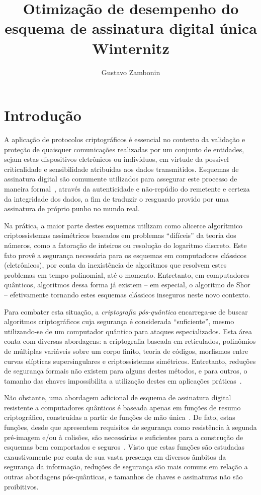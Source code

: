 \documentclass[12pt]{report}
\title{
  Otimização de desempenho
  do esquema de assinatura digital única Winternitz
}
\author{Gustavo Zambonin}
\date{}
\begin{document}
\maketitle

\tableofcontents

\chapter{Introdução}

A aplicação de protocolos criptográficos é essencial no contexto da validação e
proteção de quaisquer comunicações realizadas por um conjunto de entidades,
sejam estas dispositivos eletrônicos ou indivíduos, em virtude da possível
criticalidade e sensibilidade atribuídas aos dados transmitidos. Esquemas de
assinatura digital são comumente utilizados para assegurar este processo de
maneira formal~\cite{Goldreich:2004:FCV:975541}, através da autenticidade e
não-repúdio do remetente e certeza da integridade dos dados, a fim de traduzir
o resguardo provido por uma assinatura de próprio punho no mundo real.

Na prática, a maior parte destes esquemas utilizam como alicerce algorítmico
criptossistemas assimétricos baseados em problemas ``difíceis'' da teoria dos
números, como a fatoração de inteiros ou resolução do logaritmo discreto.
Este fato provê a segurança necessária para os esquemas
em computadores clássicos (eletrônicos), por conta da inexistência de
algoritmos que resolvem estes problemas em tempo polinomial, até o momento.
Entretanto, em computadores quânticos, algoritmos dessa forma já existem -- em
especial, o algoritmo de Shor~\cite{Shor:1997:PAP:264393.264406} --
efetivamente tornando estes esquemas clássicos inseguros neste novo contexto.

Para combater esta situação, a \emph{criptografia pós-quântica} encarrega-se de
buscar algoritmos criptográficos cuja segurança é considerada ``suficiente'',
mesmo utilizando-se de um computador quântico para ataques especializados. Esta
área conta com diversas abordagens: a criptografia baseada em reticulados,
polinômios de múltiplas variáveis sobre um corpo finito, teoria de códigos,
morfismos entre curvas elípticas supersingulares e criptossistemas simétricos.
Entretanto, reduções de segurança formais não existem para alguns destes
métodos, e para outros, o tamanho das chaves impossibilita a utilização destes
em aplicações práticas~\cite{Bernstein2017}.

Não obstante, uma abordagem adicional de esquema de assinatura digital
resistente a computadores quânticos é baseada apenas em funções de
resumo criptográfico, construídas a partir de funções de mão
única~\cite{cryptoeprint:2005:328}. De fato, estas funções, desde que
apresentem requisitos de segurança como resistência à segunda pré-imagem e/ou
à colisões, são necessárias e suficientes para a construção de esquemas bem
comportados e seguros~\cite{Rompel:1990:OFN:100216.100269}. Visto que estas
funções são estudadas exaustivamente por conta de sua vasta presença em
diversos âmbitos da segurança da informação, reduções de segurança são mais
comuns em relação a outras abordagens pós-quânticas, e tamanhos de chaves e
assinaturas não são proibitivos.
\end{document}
